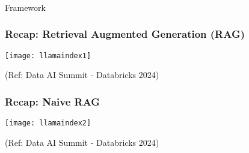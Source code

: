 \begin{frame}[fragile]\frametitle{}
\begin{center}
{\Large Framework}
\end{center}
\end{frame}

\begin{frame}[fragile]\frametitle{Recap: Retrieval Augmented Generation (RAG)}

\begin{center}
\texttt{[image: llamaindex1]}

{\tiny (Ref: Data AI Summit - Databricks 2024)}
\end{center}
\end{frame}

\begin{frame}[fragile]\frametitle{Recap: Naive RAG}

\begin{center}
\texttt{[image: llamaindex2]}

{\tiny (Ref: Data AI Summit - Databricks 2024)}
\end{center}
\end{frame}


